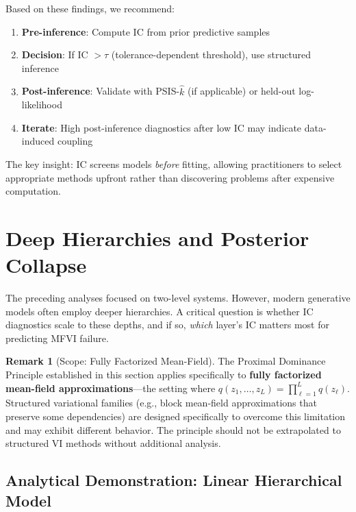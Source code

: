 \documentclass[10pt]{article} %
\theoremstyle{plain}
\theoremstyle{definition}
\newtheorem{remark}[theorem]{Remark}
\begin{document}
Based on these findings, we recommend:

\begin{enumerate}[nosep]
    \item \textbf{Pre-inference}: Compute IC from prior predictive samples
    \item \textbf{Decision}: If IC $> \tau$ (tolerance-dependent threshold), use structured inference
    \item \textbf{Post-inference}: Validate with PSIS-$\hat{k}$ (if applicable) or held-out log-likelihood
    \item \textbf{Iterate}: High post-inference diagnostics after low IC may indicate data-induced coupling
\end{enumerate}

\noindent The key insight: IC screens models \emph{before} fitting, allowing practitioners to select appropriate methods upfront rather than discovering problems after expensive computation.

\section{Deep Hierarchies and Posterior Collapse}
\label{sec:deep}

The preceding analyses focused on two-level systems. However, modern generative models often employ deeper hierarchies. A critical question is whether IC diagnostics scale to these depths, and if so, \emph{which} layer's IC matters most for predicting MFVI failure.

\begin{remark}[Scope: Fully Factorized Mean-Field]
\label{rem:proximal-scope}
The Proximal Dominance Principle established in this section applies specifically to \textbf{fully factorized mean-field approximations}---the setting where $q(z_1, \ldots, z_L) = \prod_{\ell=1}^L q(z_\ell)$. Structured variational families (e.g., block mean-field approximations that preserve some dependencies) are designed specifically to overcome this limitation and may exhibit different behavior. The principle should not be extrapolated to structured VI methods without additional analysis.
\end{remark}

\subsection{Analytical Demonstration: Linear Hierarchical Model}
\label{sec:linear-vae}
\end{document}
